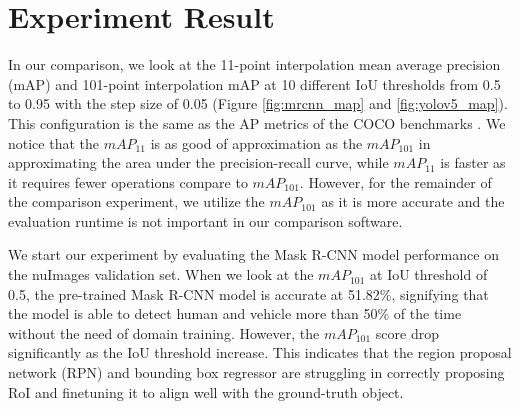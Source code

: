 \section{Experiment Result}  \label{sec:experiment_result}

In our comparison, we look at the 11-point interpolation mean average precision (mAP) and 101-point interpolation mAP at 10 different IoU thresholds from 0.5 to 0.95 with the step size of 0.05 (Figure \ref{fig:mrcnn_map} and \ref{fig:yolov5_map}). This configuration is the same as the AP metrics of the COCO benchmarks \cite{coco_2014}. We notice that the $mAP_{11}$ is as good of approximation as the $mAP_{101}$ in approximating the area under the precision-recall curve, while $mAP_{11}$ is faster as it requires fewer operations compare to $mAP_{101}$. However, for the remainder of the comparison experiment, we utilize the $mAP_{101}$ as it is more accurate and the evaluation runtime is not important in our comparison software.

We start our experiment by evaluating the Mask R-CNN model performance on the nuImages validation set. When we look at the $mAP_{101}$ at IoU threshold of 0.5, the pre-trained Mask R-CNN model is accurate at 51.82\%, signifying that the model is able to detect human and vehicle more than 50\% of the time without the need of domain training. However, the $mAP_{101}$ score drop significantly as the IoU threshold increase. This indicates that the region proposal network (RPN) and bounding box regressor are struggling in correctly proposing RoI and finetuning it to align well with the ground-truth object.

